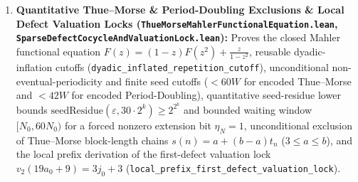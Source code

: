 \documentclass[11pt]{article}
\begin{document}
\begin{enumerate}
  \item \textbf{Quantitative Thue--Morse \& Period-Doubling Exclusions \& Local Defect Valuation Locks (\texttt{ThueMorseMahlerFunctionalEquation.lean}, \texttt{SparseDefectCocycleAndValuationLock.lean}):} Proves the closed Mahler functional equation $F(z) = (1-z)F(z^2) + \frac{z}{1-z^2}$, reusable dyadic-inflation cutoffs (\texttt{dyadic\_inflated\_repetition\_cutoff}), unconditional non-eventual-periodicity and finite seed cutoffs ($< 60W$ for encoded Thue--Morse and $< 42W$ for encoded Period-Doubling), quantitative seed-residue lower bounds $\mathrm{seedResidue}(\varepsilon, 30\cdot 2^k) \ge 2^{2^k}$ and bounded waiting window $[N_0, 60 N_0)$ for a forced nonzero extension bit $\eta_N = 1$, unconditional exclusion of Thue--Morse block-length chains $s(n) = a + (b-a)t_n$ ($3 \le a \le b$), and the local prefix derivation of the first-defect valuation lock $v_2(19a_0 + 9) = 3j_0 + 3$ (\texttt{local\_prefix\_first\_defect\_valuation\_lock}).

\end{enumerate}
\end{document}
